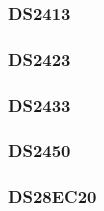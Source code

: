 

\subsubsection{DS2413}



\subsubsection{DS2423}



\subsubsection{DS2433}



\subsubsection{DS2450}



\subsubsection{DS28EC20}



%
%
%

%
%
%
%
